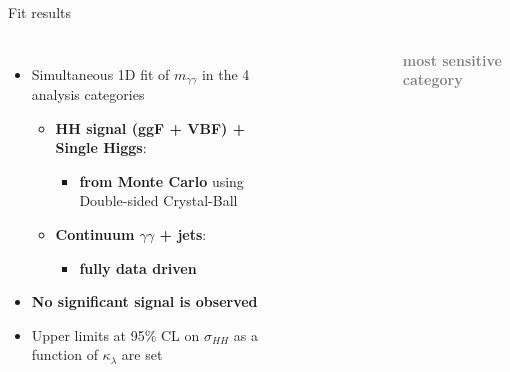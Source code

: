 \begin{frame}{Fit results}

\begin{columns}
\begin{itemize}
    \item Simultaneous 1D fit of \textbf{$m_{\gamma\gamma}$} in the 4 analysis categories
    \begin{itemize}
        \item \textbf{\textcolor{HHred}{HH signal} (ggF + VBF) + \textcolor{HHred}{Single Higgs}}: 
        \begin{itemize}
            \item \textbf{from Monte Carlo} using Double-sided Crystal-Ball
        \end{itemize}
       \item \textbf{\textcolor{HHturquoise_d}{Continuum $\gamma\gamma$ + jets}}:
       \begin{itemize}
           \item \textbf{fully data driven}
       \end{itemize}
    \end{itemize}
    \item \textbf{\textcolor{HHred}{No significant signal is observed}}
    \item Upper limits at 95\% CL on $\sigma_{HH}$ as a function of $\kappa_{\lambda}$ are set
\end{itemize}


\begin{figure}
    \centering
\end{figure}

\begin{center}
   \textcolor{gray}{ \textbf{most sensitive category}}
\end{center}

\end{columns}    
\end{frame}


